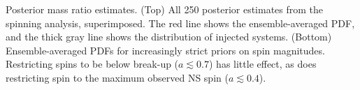 Posterior mass ratio estimates.  (Top) All 250 posterior estimates from the spinning analysis, superimposed.  The red line shows the ensemble-averaged PDF, and the thick gray line shows the distribution of injected systems. (Bottom) Ensemble-averaged PDFs for increasingly strict priors on spin magnitudes.  Restricting spins to be below break-up ($a\lesssim0.7$) has little effect, as does restricting spin to the maximum observed NS spin ($a\lesssim0.4$).